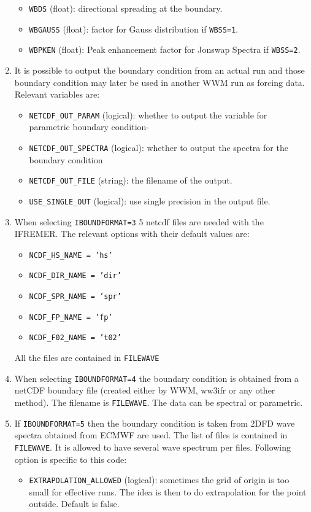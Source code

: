 \documentclass[12pt]{amsart}
\begin{document}
\begin{enumerate}
\begin{itemize}
  \item {\tt WBDS} (float): directional spreading at the boundary.
  \item {\tt WBGAUSS} (float): factor for Gauss distribution if {\tt WBSS=1}.
  \item {\tt WBPKEN} (float):  Peak enhancement factor for Jonswap Spectra if {\tt WBSS=2}.
  \end{itemize}
\item It is possible to output the boundary condition from an actual run and those boundary condition may later be used in another WWM run as forcing data. Relevant variables are:
  \begin{itemize}
  \item {\tt NETCDF\_OUT\_PARAM} (logical): whether to output the variable for parametric boundary condition-
  \item {\tt NETCDF\_OUT\_SPECTRA} (logical): whether to output the spectra for the boundary condition
  \item {\tt NETCDF\_OUT\_FILE} (string): the filename of the output.
  \item {\tt USE\_SINGLE\_OUT} (logical): use single precision in the output file.
  \end{itemize}
\item When selecting {\tt IBOUNDFORMAT=3} 5 netcdf files are needed with the IFREMER. The relevant options with their default values are:
  \begin{itemize}
  \item {\tt NCDF\_HS\_NAME = 'hs'}
  \item {\tt NCDF\_DIR\_NAME  = 'dir'}
  \item {\tt NCDF\_SPR\_NAME  = 'spr'}
  \item {\tt NCDF\_FP\_NAME   = 'fp'}
  \item {\tt NCDF\_F02\_NAME  = 't02'}
  \end{itemize}
  All the files are contained in {\tt FILEWAVE}
\item When selecting {\tt IBOUNDFORMAT=4} the boundary condition is obtained from a netCDF boundary file (created either by WWM, ww3ifr or any other method). The filename is {\tt FILEWAVE}. The data can be spectral or parametric.
\item If {\tt IBOUNDFORMAT=5} then the boundary condition is taken from 2DFD wave spectra obtained from ECMWF are used. The list of files is contained in {\tt FILEWAVE}. It is allowed to have several wave spectrum per files. Following option is specific to this code:
  \begin{itemize}
  \item {\tt EXTRAPOLATION\_ALLOWED} (logical): sometimes the grid of origin is too small for effective runs. The idea is then to do extrapolation for the point outside. Default is false.
  \end{itemize}

\end{enumerate}
\end{document}
